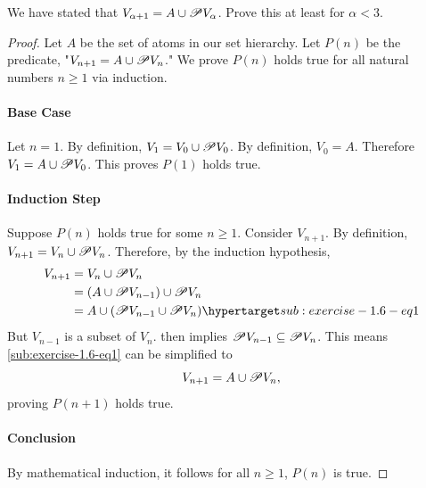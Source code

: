 \documentclass{report}
\begin{document}
We have stated that $V_{\alpha + 1} = A \cup \mathscr{P}V_\alpha$.
Prove this at least for $\alpha < 3$.

\begin{proof}

  Let $A$ be the set of atoms in our set hierarchy.
  Let $P(n)$ be the predicate, "$V_{n + 1} = A \cup \mathscr{P}V_n$."
  We prove $P(n)$ holds true for all natural numbers $n \geq 1$ via induction.

  \paragraph{Base Case}%

    Let $n = 1$.
    By definition, $V_1 = V_0 \cup \mathscr{P}V_0$.
    By definition, $V_0 = A$.
    Therefore $V_1 = A \cup \mathscr{P}V_0$.
    This proves $P(1)$ holds true.

  \paragraph{Induction Step}%

    Suppose $P(n)$ holds true for some $n \geq 1$.
    Consider $V_{n+1}$.
    By definition, $V_{n+1} = V_n \cup \mathscr{P}V_n$.
    Therefore, by the induction hypothesis,
      \begin{align}
        V_{n+1}
          & = V_n \cup \powerset{V_n}
            \nonumber \\
          & = (A \cup \powerset{V_{n-1}}) \cup \powerset{V_n}
            \nonumber \\
          & = A \cup (\powerset{V_{n-1}} \cup \powerset{V_n})
            \hyperlabel{sub:exercise-1.6-eq1}
      \end{align}
    But $V_{n-1}$ is a subset of $V_n$.
     then implies
      $\mathscr{P}V_{n-1} \subseteq \mathscr{P}V_n$.
    This means \eqref{sub:exercise-1.6-eq1} can be simplified to
      $$V_{n+1} = A \cup \mathscr{P}V_n,$$
    proving $P(n+1)$ holds true.

  \paragraph{Conclusion}%

    By mathematical induction, it follows for all $n \geq 1$, $P(n)$ is true.

\end{proof}

\subsection{}%
\end{document}
